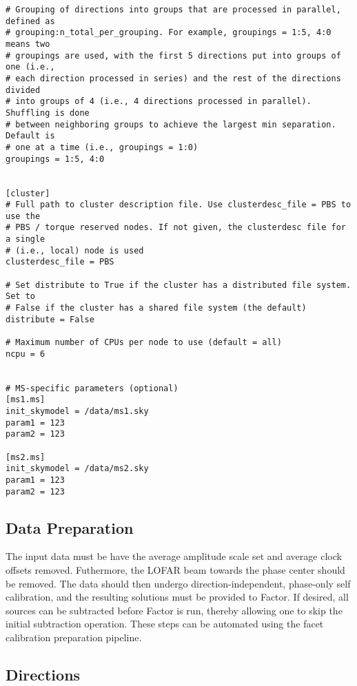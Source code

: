 \documentclass[structabstract]{article}
\begin{document}
\begin{verbatim}
# Grouping of directions into groups that are processed in parallel, defined as
# grouping:n_total_per_grouping. For example, groupings = 1:5, 4:0 means two
# groupings are used, with the first 5 directions put into groups of one (i.e.,
# each direction processed in series) and the rest of the directions divided
# into groups of 4 (i.e., 4 directions processed in parallel). Shuffling is done
# between neighboring groups to achieve the largest min separation. Default is
# one at a time (i.e., groupings = 1:0)
groupings = 1:5, 4:0


[cluster]
# Full path to cluster description file. Use clusterdesc_file = PBS to use the
# PBS / torque reserved nodes. If not given, the clusterdesc file for a single
# (i.e., local) node is used
clusterdesc_file = PBS

# Set distribute to True if the cluster has a distributed file system. Set to
# False if the cluster has a shared file system (the default)
distribute = False

# Maximum number of CPUs per node to use (default = all)
ncpu = 6


# MS-specific parameters (optional)
[ms1.ms]
init_skymodel = /data/ms1.sky
param1 = 123
param2 = 123

[ms2.ms]
init_skymodel = /data/ms2.sky
param1 = 123
param2 = 123
\end{verbatim}


\subsection{Data Preparation}
\label{factor:data}

The input data must be have the average amplitude scale set and average clock
offsets removed. Futhermore, the LOFAR beam towards the phase center should be
removed. The data should then undergo direction-independent, phase-only self
calibration, and the resulting solutions must be provided to Factor. If desired,
all sources can be subtracted before Factor is run, thereby allowing one to skip
the initial subtraction operation. These steps can be automated using the facet
calibration preparation pipeline.

\subsection{Directions}
\label{factor:directions}
\end{document}

